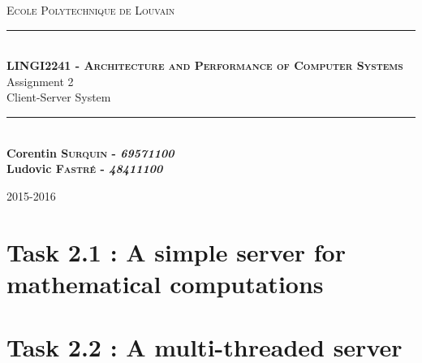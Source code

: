 \documentclass[11pt,a4paper]{article}
\newcommand{\HRule}{\rule{\linewidth}{0.5mm}}
\begin{document}
\begin{titlepage}

\begin{center}

\centering
    
    
\textsc{\Large Ecole Polytechnique de Louvain}\\[3.0cm]



\HRule \\[0.4cm]
\textsc{\LARGE \bfseries LINGI2241 - Architecture and Performance of Computer Systems}\\[0.5cm]
{ \huge Assignment 2\\ Client-Server System}\\[0.4cm]

\HRule \\[3cm]

{\LARGE \textbf{Corentin \textsc{Surquin} - \textit{69571100}} \\ \vspace{0.4cm}
\textbf{Ludovic \textsc{Fastré} - \textit{48411100}}}

\vfill



\vfill
{\large 2015-2016}

\end{center}

\end{titlepage}



\section{Task 2.1 : A simple server for mathematical computations}


\section{Task 2.2 : A multi-threaded server}
\end{document}
